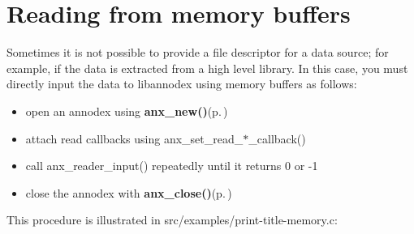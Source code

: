\section{Reading from memory buffers}
\label{group__reading__memory}
Sometimes it is not possible to provide a file descriptor for a data source; for example, if the data is extracted from a high level library. In this case, you must directly input the data to libannodex using memory buffers as follows:

\begin{itemize}
\item open an annodex using {\bf anx\_\-new()}{\rm (p.\,\pageref{anx__general_8h_a5})}\item attach read callbacks using anx\_\-set\_\-read\_\-$\ast$\_\-callback()\item call anx\_\-reader\_\-input() repeatedly until it returns 0 or -1\item close the annodex with {\bf anx\_\-close()}{\rm (p.\,\pageref{anx__general_8h_a7})}\end{itemize}


This procedure is illustrated in src/examples/print-title-memory.c:



